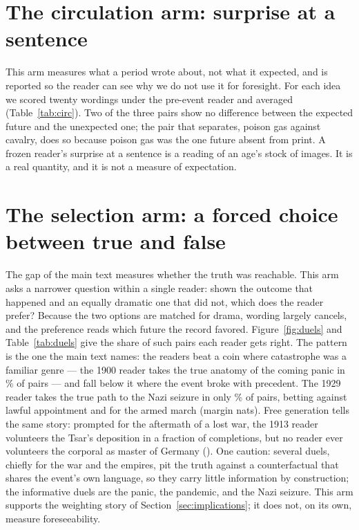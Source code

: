 \documentclass[11pt]{article}
\begin{document}
\section{The circulation arm: surprise at a sentence}\label{app:circulation}
This arm measures what a period wrote about, not what it expected, and is reported so the reader can see why
we do not use it for foresight. For each idea we scored twenty wordings under the pre-event reader and
averaged (Table~\ref{tab:circ}). Two of the three pairs show no difference between the expected future and
the unexpected one; the pair that separates, poison gas against cavalry, does so because poison gas was the
one future absent from print. A frozen reader's surprise at a sentence is a reading of an age's stock of
images. It is a real quantity, and it is not a measure of expectation.

\begin{table}[h]\centering\small

\caption{Surprise at a sentence, 1900 reader, twenty wordings per idea, in nats per word. Lower means less
surprising. Where the expected and unexpected futures score alike, the measure is reading what was printed,
not what was expected.}
\label{tab:circ}
\end{table}

\section{The selection arm: a forced choice between true and false}\label{app:selection}
The gap of the main text measures whether the truth was reachable. This arm asks a narrower question within
a single reader: shown the outcome that happened and an equally dramatic one that did not, which does the
reader prefer? Because the two options are matched for drama, wording largely cancels, and the preference
reads which future the record favored. Figure~\ref{fig:duels} and Table~\ref{tab:duels} give the share of
such pairs each reader gets right. The pattern is the one the main text names: the readers beat a coin where
catastrophe was a familiar genre --- the 1900 reader takes the true anatomy of the coming panic in
\NduelPanicPre\% of pairs --- and fall below it where the event broke with precedent. The 1929 reader takes
the true path to the Nazi seizure in only \NduelNaziPre\% of pairs, betting against lawful appointment and
for the armed march (margin \NduelNaziLawful{} nats). Free generation tells the same story: prompted for the
aftermath of a lost war, the 1913 reader volunteers the Tsar's deposition in a fraction \NfreeTsarTh{} of
completions, but no reader ever volunteers the corporal as master of Germany (\NfreeNaziTN). One caution:
several duels, chiefly for the war and the empires, pit the truth against a counterfactual that shares the
event's own language, so they carry little information by construction; the informative duels are the panic,
the pandemic, and the Nazi seizure. This arm supports the weighting story of
Section~\ref{sec:implications}; it does not, on its own, measure foreseeability.
\end{document}
